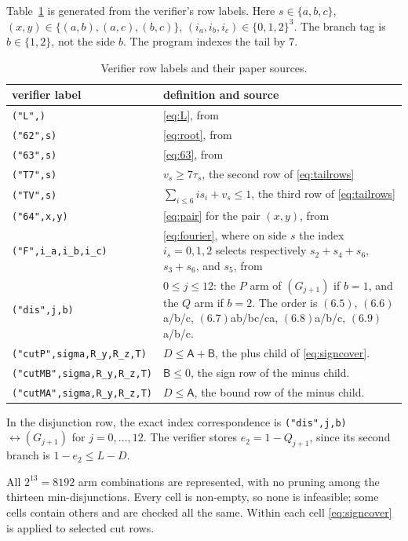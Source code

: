\documentclass{amsart}
\numberwithin{equation}{section}
\numberwithin{table}{section}
\begin{document}
Table~\ref{tab:rows} is generated from the verifier's row labels. Here
$s\in\{a,b,c\}$, $(x,y)\in\{(a,b),(a,c),(b,c)\}$,
$(i_a,i_b,i_c)\in\{0,1,2\}^3$. The branch tag is $b\in\{1,2\}$, not the
side $b$. The program indexes the tail by $7$.
\begin{table}[ht]
\centering\scriptsize
\caption{Verifier row labels and their paper sources.}\label{tab:rows}
\begin{tabular}{@{}p{}p{}@{}}
\hline verifier label & definition and source \\\hline
\texttt{("L",)} & \eqref{eq:L}, from \cite[(6.1)]{BBLT}\\
\texttt{("62",s)} & \eqref{eq:root}, from \cite[(6.2)]{BBLT}\\
\texttt{("63",s)} & \eqref{eq:63}, from \cite[(6.3)]{BBLT}\\
\texttt{("T7",s)} & $v_s\ge7\tau_s$, the second row of \eqref{eq:tailrows}\\
\texttt{("TV",s)} & $\sum_{i\le6}i s_i+v_s\le1$, the third row of \eqref{eq:tailrows}\\
\texttt{("64",x,y)} & \eqref{eq:pair} for the pair $(x,y)$, from \cite[(6.4)]{BBLT}\\
\texttt{("F",i\_a,i\_b,i\_c)} & \eqref{eq:fourier}, where on side $s$ the index $i_s=0,1,2$ selects respectively $s_2+s_4+s_6$, $s_3+s_6$, and $s_5$, from \cite[(6.10)]{BBLT}\\
\texttt{("dis",j,b)} & $0\le j\le12$: the $P$ arm of $(G_{j+1})$ if $b=1$, and the $Q$ arm if $b=2$. The order is $(6.5)$, $(6.6)$a/b/c, $(6.7)$ab/bc/ca, $(6.8)$a/b/c, $(6.9)$a/b/c.\\
\texttt{("cutP",sigma,R\_y,R\_z,T)} & $D\le\mathsf A+\mathsf B$, the plus child of \eqref{eq:signcover}.\\
\texttt{("cutMB",sigma,R\_y,R\_z,T)} & $\mathsf B\le0$, the sign row of the minus child.\\
\texttt{("cutMA",sigma,R\_y,R\_z,T)} & $D\le\mathsf A$, the bound row of the minus child.\\
\hline
\end{tabular}
\end{table}
In the disjunction row, the exact index correspondence is
\texttt{("dis",j,b)} $\leftrightarrow (G_{j+1})$ for $j=0,\ldots,12$.
The verifier stores $e_2=1-Q_{j+1}$, since its second branch is
$1-e_2\le L-D$.

All $2^{13}=8192$ arm combinations are represented, with no pruning among the
thirteen min-disjunctions. Every cell is non-empty, so none is infeasible;
some cells contain others and are checked all the same. Within each cell
\eqref{eq:signcover} is applied to selected cut rows.
\end{document}
